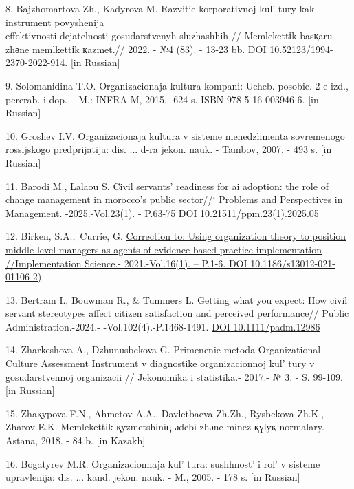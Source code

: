 \begin{references}
8. Bajzhomartova Zh., Kadyrova M. Razvitie korporativnoj
kul' tury kak instrument povyshenija \\effektivnosti
dejatelnosti gosudarstvenyh sluzhashhih // Memlekettіk
basқaru zhәne memlkettіk қazmet.// 2022. - №4 (83). - 13-23 bb. DOI
10.52123/1994-2370-2022-914. {[}in Russian{]}

9. Solomanidina T.O. Organizacionaja kultura kompani:
Ucheb. posobie. 2-e izd., pererab. i dop. -- M.: INFRA-M, 2015. -624
s. ISBN 978-5-16-003946-6. {[}in Russian{]}

10. Groshev I.V. Organizacionaja kultura v sisteme
menedzhmenta sovremenogo rossijskogo predprijatija: dis. ... d-ra
jekon. nauk. - Tambov, 2007. - 493 s. {[}in Russian{]}

11. Barodi M., Lalaou S. Civil servants' readiness for ai adoption: the
role of change management in morocco's public sector//` Problems and
Perspectives in Management. -2025.-Vol.23(1). - P.63-75
\href{http://dx.doi.org/10.21511/ppm.23(1).2025.05}{DOI
10.21511/ppm.23(1).2025.05}

12. Birken, S.A.,~Currie, G.
\href{https://www.scopus.com/record/display.uri?eid=2-s2.0-85104625356&origin=reflist&sort=plf-f&src=s&sid=9294c12779ee47479a1a0997e8991897&sot=b&sdt=b&sl=99&s=TITLE\%28An+Examination+of+Civil+Servants\%e2\%80\%99+Assessment+of++the+New+Civil+Service+Reforms+in+Kazakhstan\%29}{Correction
to: Using organization theory to position middle-level managers as
agents of evidence-based practice implementation //Implementation
Science.- 2021.-Vol.16(1). -- P.1-6. DOI 10.1186/s13012-021-01106-2)}

13. Bertram I., Bouwman R., \& Tummers L. Getting what you expect: How
civil servant stereotypes affect citizen satisfaction and perceived
performance// Public Administration.-2024.- -Vol.102(4).-P.1468-1491.
\href{https://doi.org/10.1111/padm.12986}{DOI 10.1111/padm.12986}

14. Zharkeshova A., Dzhunusbekova G. Primenenie metoda Organizational
Culture Assessment Instrument v diagnostike organizacionnoj
kul' tury v gosudarstvennoj organizacii // Jekonomika i
statistika.- 2017.- № 3. - S. 99-109.{[}in Russian{]}

15. Zhaқypova F.N., Ahmetov A.A., Davletbaeva Zh.Zh., Rysbekova Zh.K.,
Zharov E.K. Memlekettіk қyzmetshіnің әdebі zhәne mіnez-құlyқ normalary.
-Astana, 2018. - 84 b. {[}in Kazakh{]}

16. Bogatyrev M.R. Organizacionnaja kul' tura:
sushhnost'{} i rol'{} v sisteme
upravlenija: dis. ... kand. jekon. nauk. - M., 2005. - 178 s. {[}in
Russian{]}


\end{references}
